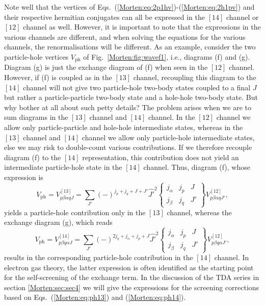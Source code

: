 Note well that the vertices of Eqs.~(\ref{Morten:eq:2p1hv})-(\ref{Morten:eq:2h1pv})
and their respective 
hermitian conjugates can all be expressed in the $[14]$ channel
or $[12]$ channel as well.
However, it is important to note that the expressions in the various
channels are different, and when solving the equations for the various 
channels, the renormalisations will be different. As an example, consider
the two particle-hole vertices $V_{\mathrm{ph}}$ 
of Fig.~\ref{Morten:fig:wavef1}, i.e., diagrams (f) and (g).
Diagram (g) is just the exchange diagram of (f) when seen in the 
$[12]$ channel. However, if (f) is coupled as in the $[13]$ channel,
recoupling this diagram to the $[14]$ channel will not give 
two particle-hole
two-body states coupled to a final $J$ but rather 
a particle-particle two-body state and a hole-hole  two-body state.
But why bother at all about such petty details? The problem arises when we 
are to  sum diagrams in the $[13]$ channel and $[14]$ channel.  
In the $[12]$ channel we allow only particle-particle and hole-hole
intermediate states, whereas in the $[13]$ channel and $[14]$ channel
we allow only particle-hole intermediate states, else we may risk
to double-count various contributions. 
If we therefore recouple
diagram (f) to the $[14]$ representation, this contribution
does not yield an intermediate particle-hole state
in the $[14]$ channel.
Thus, diagram (f), whose expression is 
\begin{equation}
      V_{\mathrm{ph}}=V_{p\beta \alpha q J}^{[13]}=
      {\displaystyle \sum_{J'}}(-)^{j_p+j_q+J+J'}\hat{J'}^2
      \left\{
      \begin{array}{ccc}
       j_{\alpha}&j_p&J\\j_{\beta}&j_q&J'
      \end{array}
       \right\}
       V_{p\beta \alpha q J'}^{[12]},
       \label{Morten:eq:ph13}
\end{equation}
yields a particle-hole contribution only in the $[13]$ channel,
whereas the exchange diagram (g), which reads
\begin{equation}
      V_{\mathrm{ph}}=V_{p\beta q\alpha J}^{[14]}=
      {\displaystyle \sum_{J'}}(-)^{2j_q+j_{\alpha}+j_p+J}\hat{J'}^2
      \left\{
      \begin{array}{ccc}
       j_{\alpha}&j_p&J\\j_{\beta}&j_{q}&J'
      \end{array}
       \right\}
       V_{p\beta q\alpha J'}^{[12]},
       \label{Morten:eq:ph14}
\end{equation}
results in the corresponding particle-hole contribution in the 
$[14]$ channel.
In electron gas theory, the latter expression 
is often identified as the starting point for the self-screening 
of the exchange term. 
In the discussion of the TDA series in 
section \ref{Morten:sec:sec4} we will give the expressions for the screening
corrections based on Eqs.~(\ref{Morten:eq:ph13}) and (\ref{Morten:eq:ph14}). 

